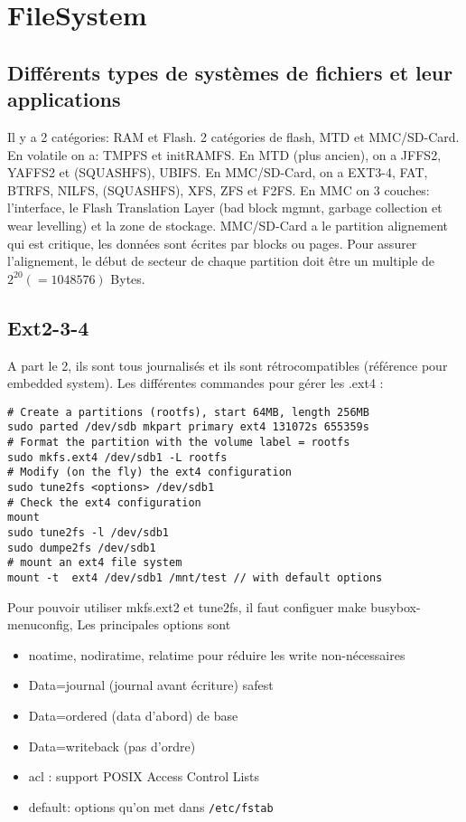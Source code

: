 \section{FileSystem}
\subsection{Différents types de systèmes de fichiers et leur applications}
Il y a 2 catégories: RAM et Flash. 2 catégories de flash, MTD et MMC/SD-Card.
En volatile on a: TMPFS et initRAMFS. En MTD (plus ancien), on a JFFS2, YAFFS2 et (SQUASHFS), UBIFS. En MMC/SD-Card, on a EXT3-4, FAT, BTRFS, NILFS, (SQUASHFS), XFS, ZFS et F2FS. En MMC on 3 couches: l'interface, le Flash Translation Layer (bad block mgmnt, garbage collection et wear levelling) et la zone de stockage. MMC/SD-Card a le partition alignement qui est critique, les données sont écrites par blocks ou pages. Pour assurer l'alignement, le début de secteur de chaque partition doit être un multiple de $2^20(=1048576)$ Bytes.
\subsection{Ext2-3-4}
A part le 2, ils sont tous journalisés et ils sont rétrocompatibles (référence pour embedded system). Les différentes commandes pour gérer les .ext4 :
\begin{Verbatim}[breaklines=true, breakanywhere=true]
# Create a partitions (rootfs), start 64MB, length 256MB
sudo parted /dev/sdb mkpart primary ext4 131072s 655359s
# Format the partition with the volume label = rootfs
sudo mkfs.ext4 /dev/sdb1 -L rootfs
# Modify (on the fly) the ext4 configuration
sudo tune2fs <options> /dev/sdb1
# Check the ext4 configuration
mount
sudo tune2fs -l /dev/sdb1
sudo dumpe2fs /dev/sdb1
# mount an ext4 file system
mount -t  ext4 /dev/sdb1 /mnt/test // with default options
\end{Verbatim}
Pour pouvoir utiliser mkfs.ext2 et tune2fs, il faut configuer make busybox-menuconfig, Les principales options sont
\begin{itemize}
\item noatime, nodiratime, relatime pour réduire les write non-nécessaires
\item Data=journal (journal avant écriture) safest
\item Data=ordered (data d'abord) de base
\item Data=writeback (pas d'ordre)
\item acl : support POSIX Access Control Lists
\item default: options qu'on met dans \verb!/etc/fstab!
\end{itemize}
